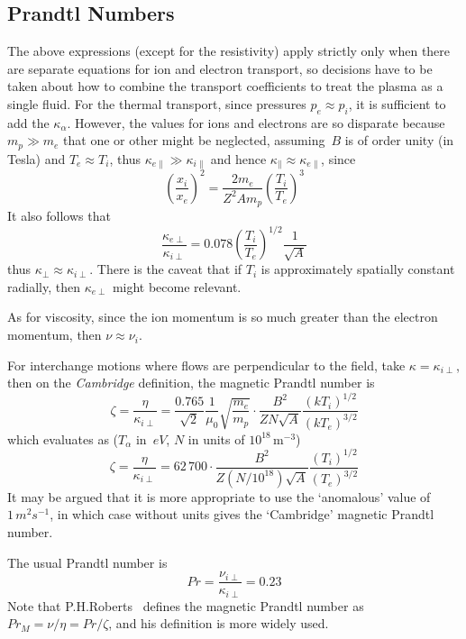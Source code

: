 \subsection{Prandtl Numbers}\label{sec:prandtl}
The above expressions (except for the resistivity) apply strictly only when there
are separate equations for ion and electron transport, 
so decisions have to be taken about how to combine the transport coefficients
to treat the plasma as a single fluid. For the thermal transport, since 
pressures $p_e\approx p_i$, it is sufficient to add the $\kappa_\alpha$. However, the values for ions and electrons
are so disparate because $m_p\gg m_e$ that one or other might be neglected, 
assuming~$B$ is of order unity (in Tesla) and $T_e\approx T_i$, 
thus $\kappa_{e\|} \gg \kappa_{i\|}$ and hence 
$\kappa_{\|}\approx \kappa_{e\|}$, since 
\begin{equation}\label{eq:rbrat}
\left(\frac{x_i}{x_e}\right)^2 = \frac{2m_e}{Z^2 A m_p} \left(\frac{T_i}{T_e}\right)^3
\end{equation}
It also follows that
\begin{equation}\label{eq:krat}
\frac{\kappa_{e\perp}}{\kappa_{i\perp}} = 0.078 \left(\frac{T_i}{T_e}\right)^{1/2}
\frac{1}{\sqrt{A}}
\end{equation}
thus $\kappa_{\perp}\approx \kappa_{i\perp}$.
There is the caveat that if $T_i$ is approximately spatially constant radially,
then $\kappa_{e\perp}$ might become relevant.

As for viscosity, since the ion momentum is so much greater than the electron momentum, then $\nu\approx\nu_i$.

For interchange motions where flows are perpendicular to the field, take 
$\kappa=\kappa_{i\perp}$, then on the \emph{Cambridge} definition, the magnetic Prandtl number is
\begin{equation}\label{eq:zeta}
\zeta=\frac{\eta}{\kappa_{i\perp}}=\frac{0.765}{\sqrt{2}}\frac{1}{\mu_0}\sqrt{\frac{m_e}{m_p}} \cdot
\frac{B^2}{Z N\sqrt{A}} \frac{(kT_i)^{1/2}}{(kT_e)^{3/2}}
\end{equation}
which evaluates as ($T_\alpha$ in~$eV$, $N$ in units of $10^{18}$\,m$^{-3}$)
\begin{equation}\label{eq:zetan}
\zeta=\frac{\eta}{\kappa_{i\perp}}=62\,700 \cdot \frac{B^2}{Z (N/10^{18})\sqrt{A}} \frac{(T_i)^{1/2}}{(T_e)^{3/2}}
\end{equation}
It may be argued that it is more appropriate to use the `anomalous'  value of $1\,m^2 s^{-1}$,
in which case  without units gives the `Cambridge'  magnetic Prandtl number.

The usual Prandtl number is
\begin{equation}\label{eq:sigma}
Pr=\frac{\nu_{i\perp}}{\kappa_{i\perp}}=0.23
\end{equation}
Note that P.H.Roberts~\cite{roberts} defines the magnetic Prandtl number
as $Pr_M=\nu/\eta=Pr/\zeta$, and his definition is more widely used.

